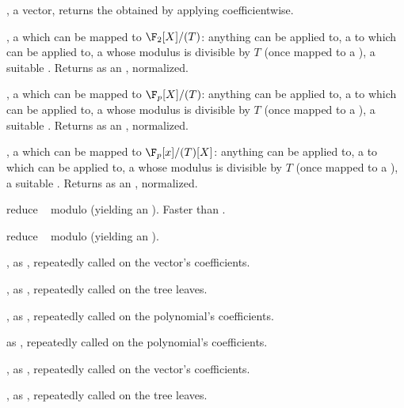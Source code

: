 ,  a vector, returns the
 obtained by applying  coefficientwise.

,  a  which can be
mapped to $\F_2[X]/(T)$: anything  can be applied to,
a  to which  can be applied to, a 
whose modulus is divisible by $T$ (once mapped to a ), a suitable
. Returns  as an , normalized.

,  a  which can be
mapped to $\F_p[X]/(T)$: anything  can be applied to,
a  to which  can be applied to, a 
whose modulus is divisible by $T$ (once mapped to a ), a suitable
. Returns  as an , normalized.

,  a  which can be
mapped to $\F_p[x]/(T)[X]$: anything  can be applied to,
a  to which  can be applied to, a 
whose modulus is divisible by $T$ (once mapped to a ), a suitable
. Returns  as an , normalized.

 reduce ~ modulo 
(yielding an ). Faster than .

 reduce ~ modulo 
(yielding an ).

, as , repeatedly
called on the vector's coefficients.

, as , repeatedly
called on the tree leaves.

, as ,
repeatedly called on the polynomial's coefficients.

 as ,
repeatedly called on the polynomial's coefficients.

, as ,
repeatedly called on the vector's coefficients.

, as ,
repeatedly called on the tree leaves.

